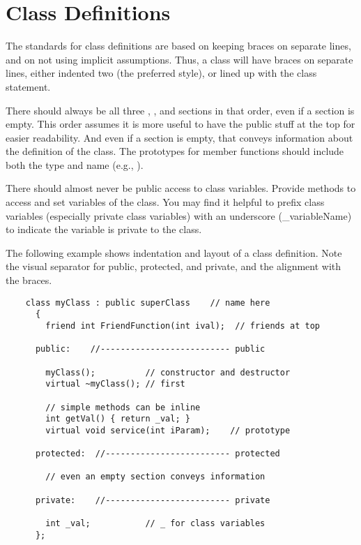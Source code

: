 \section{Class Definitions}

The standards for class definitions are based on keeping
braces on separate lines, and on not using implicit assumptions.
Thus, a class will have braces on separate lines, either indented
two (the preferred style), or lined up with the class statement.

There should always be all three , ,
and  sections in that order, even if a section is
empty. This order assumes it is more useful to have the public
stuff at the top for easier readability. And even if a section
is empty, that conveys information about the definition of the class.
The prototypes for member functions should include both the type
and name (e.g., ).

There should almost never be public access to class variables.
Provide methods to access and set variables of the class. You
may find it helpful to prefix class variables (especially private
class variables) with an underscore (\_variableName) to indicate
the variable is private to the class.

The following example shows indentation and layout of a class
definition. Note the visual separator for public, protected, and
private, and the alignment with the braces.

\footnotesize
\begin{verbatim}
    class myClass : public superClass    // name here
      {
        friend int FriendFunction(int ival);  // friends at top

      public:    //-------------------------- public

        myClass();          // constructor and destructor
        virtual ~myClass(); // first

        // simple methods can be inline
        int getVal() { return _val; }
        virtual void service(int iParam);    // prototype

      protected:  //------------------------- protected

        // even an empty section conveys information

      private:    //------------------------- private

        int _val;           // _ for class variables
      };
\end{verbatim}
\normalfont\normalsize


